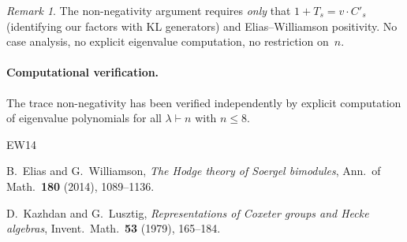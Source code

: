\documentclass[11pt]{article}
\theoremstyle{remark}
\newtheorem{remark}[theorem]{Remark}
\begin{document}
\begin{remark}
The non-negativity argument requires \emph{only} that
$1 + T_s = v \cdot C'_s$ (identifying our factors with KL generators)
and Elias--Williamson positivity.
No case analysis, no explicit eigenvalue computation, no restriction on~$n$.
\end{remark}

\paragraph{Computational verification.}
The trace non-negativity has been verified independently by explicit
computation of eigenvalue polynomials for all $\lambda \vdash n$
with $n \leq 8$.

\begin{thebibliography}{EW14}

B.~Elias and G.~Williamson,
\emph{The Hodge theory of Soergel bimodules},
Ann.\ of Math.\ \textbf{180} (2014), 1089--1136.

D.~Kazhdan and G.~Lusztig,
\emph{Representations of Coxeter groups and Hecke algebras},
Invent.\ Math.\ \textbf{53} (1979), 165--184.

\end{thebibliography}
\end{document}
